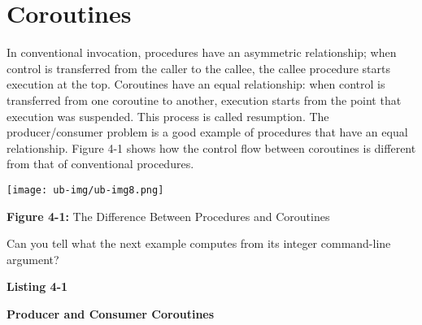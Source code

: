 \section{Coroutines}

In conventional invocation, procedures have an asymmetric
relationship; when control is transferred from the caller to the
callee, the callee procedure starts execution at the top. Coroutines
have an equal relationship: when control is transferred from one
coroutine to another, execution starts from the point that
execution was suspended. This process is called resumption. The
producer/consumer problem is a good example of
procedures that have an equal relationship. Figure 4-1 shows how the
control flow between coroutines is different from that of conventional
procedures.

{\centering \par}

\begin{center}
\texttt{[image: ub-img/ub-img8.png]}
\end{center}

{\sffamily\bfseries Figure 4-1:}
{\sffamily The Difference Between Procedures and Coroutines}

\bigskip

\noindent
Can you tell what the next example computes from its integer
command-line argument?

\bigskip

{\sffamily\bfseries
Listing 4-1}

{\sffamily\bfseries
Producer and Consumer Coroutines}


